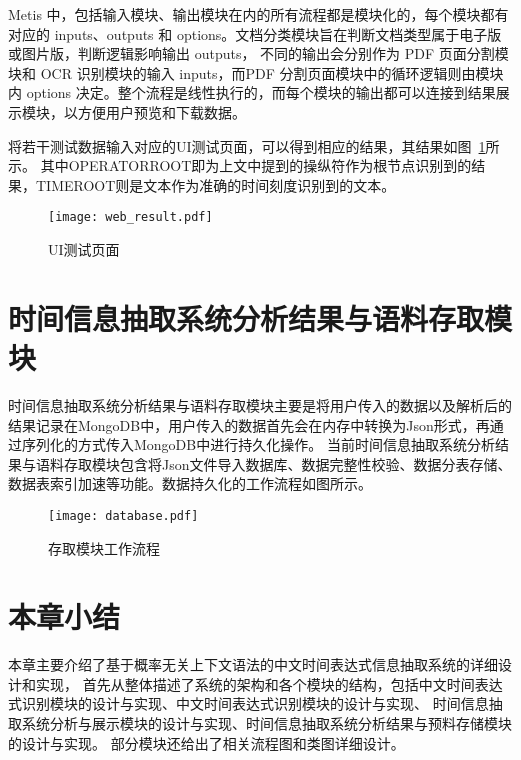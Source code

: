 Metis 中，包括输入模块、输出模块在内的所有流程都是模块化的，每个模块都有对应的 inputs、outputs 和 options。文档分类模块旨在判断文档类型属于电子版或图片版，判断逻辑影响输出 outputs，
不同的输出会分别作为 PDF 页面分割模块和 OCR 识别模块的输入 inputs，而PDF 分割页面模块中的循环逻辑则由模块内 options 决定。整个流程是线性执行的，而每个模块的输出都可以连接到结果展示模块，以方便用户预览和下载数据。

将若干测试数据输入对应的UI测试页面，可以得到相应的结果，其结果如图~\ref{fig:web_result}所示。 其中OPERATORROOT即为上文中提到的操纵符作为根节点识别到的结果，TIMEROOT则是文本作为准确的时间刻度识别到的文本。


\begin{figure}[h]
    \centering
    \texttt{[image: web\_result.pdf]}
    \caption{UI测试页面}
    \label{fig:web_result}
\end{figure}


\section{时间信息抽取系统分析结果与语料存取模块}


时间信息抽取系统分析结果与语料存取模块主要是将用户传入的数据以及解析后的结果记录在MongoDB中，用户传入的数据首先会在内存中转换为Json形式，再通过序列化的方式传入MongoDB中进行持久化操作。 
当前时间信息抽取系统分析结果与语料存取模块包含将Json文件导入数据库、数据完整性校验、数据分表存储、数据表索引加速等功能。数据持久化的工作流程如图所示。


\begin{figure}[h]
    \centering
    \texttt{[image: database.pdf]}
    \caption{存取模块工作流程}
    \label{fig:database}
\end{figure}



\section{本章小结}

本章主要介绍了基于概率无关上下文语法的中文时间表达式信息抽取系统的详细设计和实现，
首先从整体描述了系统的架构和各个模块的结构，包括中文时间表达式识别模块的设计与实现、中文时间表达式识别模块的设计与实现、
时间信息抽取系统分析与展示模块的设计与实现、时间信息抽取系统分析结果与预料存储模块的设计与实现。
部分模块还给出了相关流程图和类图详细设计。

